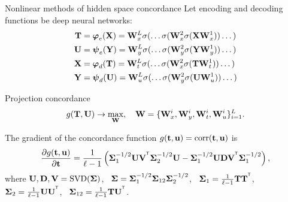 \documentclass[10pt]{beamer}
\begin{document}
\begin{frame}{Nonlinear methods of hidden space concordance}
	Let encoding and decoding functions be deep neural networks:
	\vspace{-0.1cm}
	\begin{align*}
		\bT &= \bphi_e(\bX) =  \bW_x^L \sigma(\dots \sigma(\bW_x^2 \sigma(\bX \bW_x^1)) \dots ) \\
		\bU &= \bpsi_e(\bY) =  \bW_y^L \sigma(\dots \sigma(\bW_y^2 \sigma(\bY \bW_y^1)) \dots ) \\
		\bX &= \bphi_d(\bT) =  \bW_t^L \sigma(\dots \sigma(\bW_x^2 \sigma(\bT \bW_t^1)) \dots ) \\
		\bY &= \bpsi_d(\bU) =  \bW_u^L \sigma(\dots \sigma(\bW_y^2 \sigma(\bU \bW_u^1)) \dots )
	\end{align*}
	\vspace{-0.4cm}
	\begin{block}{Projection concordance}
		\vspace{-0.3cm}
		\[
			g(\bT, \bU) \rightarrow \max_{\bW}, \quad \bW = \{\bW_x^i, \bW_y^i, \bW_t^i, \bW_u^i\}_{i=1}^L.
		\]
	\end{block}	
	\vspace{-0.3cm}
		The gradient of the concordance function $g(\bt, \bu) = \textnormal{corr}(\bt, \bu)$ is
		\[
			\frac{\partial g(\bt, \bu)}{\partial \bt} = \frac{1}{\ell - 1} \left(\bSigma_1^{-1/2} \bU \bV^{\T} \bSigma_2^{-1/2} \bU - \bSigma_1^{-1/2} \bU \bD \bV^{\T} \bSigma_1^{-1/2} \right),
		\]
		where $\bU, \bD, \bV = \textnormal{SVD}(\bSigma)$, \, $\bSigma = \bSigma_1^{-1/2} \bSigma_{12} \bSigma_2^{-1/2} $, \, $\bSigma_1 = \frac{1}{\ell - 1} \bT \bT^{\T}$, \, $\bSigma_2 = \frac{1}{\ell - 1} \bU \bU^{\T}$, \, $\bSigma_{12} = \frac{1}{\ell - 1} \bT \bU^{\T}$.
\end{frame}
\end{document}
